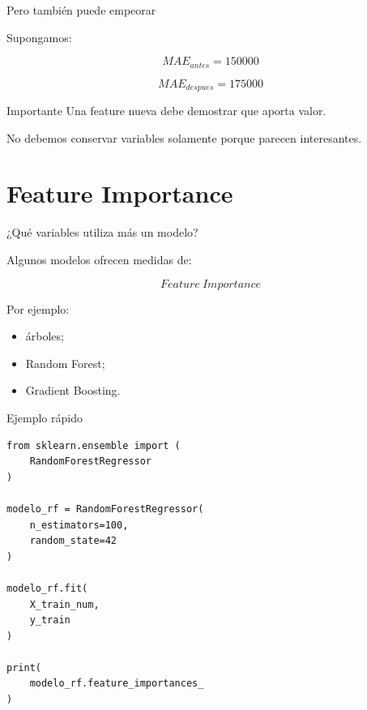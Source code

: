 \documentclass[aspectratio=169,11pt]{beamer}
\begin{document}

\begin{frame}{Pero también puede empeorar}

Supongamos:

\[
MAE_{antes}=150000
\]

\[
MAE_{despues}=175000
\]

\vspace{0.5cm}

\begin{alertblock}{Importante}
Una feature nueva debe demostrar que aporta valor.
\end{alertblock}

No debemos conservar variables solamente porque parecen interesantes.

\end{frame}

\section{Feature Importance}

\begin{frame}{¿Qué variables utiliza más un modelo?}

Algunos modelos ofrecen medidas de:

\[
\boxed{
Feature\ Importance
}
\]

Por ejemplo:

\begin{itemize}

    \item árboles;

    \item Random Forest;

    \item Gradient Boosting.

\end{itemize}

\end{frame}


\begin{frame}[fragile]{Ejemplo rápido}

\begin{lstlisting}
from sklearn.ensemble import (
    RandomForestRegressor
)

modelo_rf = RandomForestRegressor(
    n_estimators=100,
    random_state=42
)

modelo_rf.fit(
    X_train_num,
    y_train
)

print(
    modelo_rf.feature_importances_
)
\end{lstlisting}

\end{frame}
\end{document}
